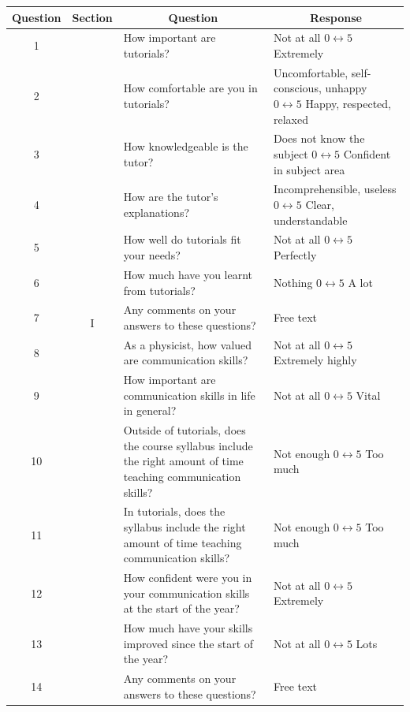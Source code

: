\begin{table}\scriptsize
\centering
\begin{tabular}{c c p{2in} p{2in}}
\toprule
\multicolumn{1}{c}{Question} & \multicolumn{1}{c}{Section} & \multicolumn{1}{c}{Question} & \multicolumn{1}{c}{Response} \\
\midrule 
\hphantom{0}1 & \multirow{12}{*}{I} & How important are tutorials? & Not at all $0 \leftrightarrow 5$ Extremely \\
\hphantom{0}2 &		& How comfortable are you in tutorials? & Uncomfortable, self-conscious, unhappy $0 \leftrightarrow 5$ Happy, respected, relaxed \\
\hphantom{0}3 & 	& How knowledgeable is the tutor? & Does not know the subject $0 \leftrightarrow 5$ Confident in subject area \\
\hphantom{0}4 &		& How are the tutor's explanations? & Incomprehensible, useless $0 \leftrightarrow 5$ Clear, understandable \\
\hphantom{0}5 & 	& How well do tutorials fit your needs? & Not at all $0 \leftrightarrow 5$ Perfectly \\
\hphantom{0}6 & 	& How much have you learnt from tutorials? & Nothing $0 \leftrightarrow 5$ A lot \\
\hphantom{0}7 &		& Any comments on your answers to these questions? & Free text \\
\midrule
\hphantom{0}8 & \multirow{16}{*}{II} & As a physicist, how valued are communication skills? & Not at all $0 \leftrightarrow 5$ Extremely highly \\
\hphantom{0}9 &	& How important are communication skills in life in general? & Not at all $0 \leftrightarrow 5$ Vital \\
10 &	& Outside of tutorials, does the course syllabus include the right amount of time teaching communication skills? & Not enough $0 \leftrightarrow 5$ Too much \\
11 & 	& In tutorials, does the syllabus include the right amount of time teaching communication skills? & Not enough $0 \leftrightarrow 5$ Too much \\
12 & 	& How confident were you in your communication skills at the start of the year? & Not at all $0 \leftrightarrow 5$ Extremely \\
13 &	& How much have your skills improved since the start of the year? & Not at all $0 \leftrightarrow 5$ Lots \\
14 &	& Any comments on your answers to these questions? & Free text \\

\end{tabular}
\end{table}
